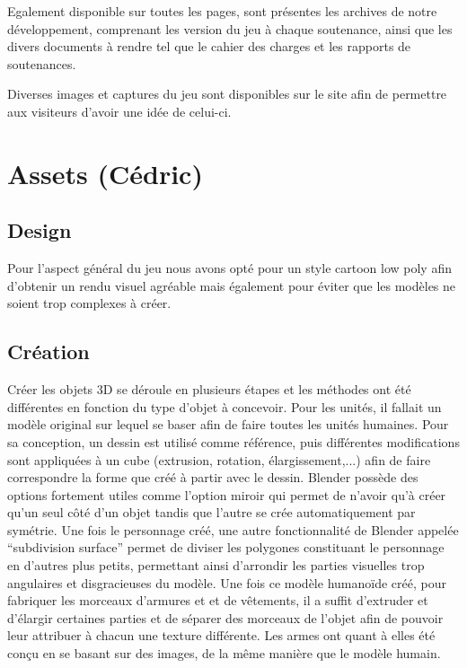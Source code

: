 \documentclass[12pt]{report}
\begin{document}
Egalement disponible sur toutes les pages, sont présentes les archives de notre
développement, comprenant les version du jeu à chaque soutenance, ainsi que les
divers documents à rendre tel que le cahier des charges et les rapports de
soutenances.

Diverses images et captures du jeu sont disponibles sur le site afin de
permettre aux visiteurs d’avoir une idée de celui-ci.

\section{Assets (Cédric)}

\subsection{Design}

Pour l’aspect général du jeu nous avons opté pour un style cartoon low poly afin
d’obtenir un rendu visuel agréable mais également pour éviter que les modèles ne
soient trop complexes à créer.

\subsection{Création}

Créer les objets 3D se déroule en plusieurs étapes et les méthodes ont été
différentes en fonction du type d’objet à concevoir. Pour les unités, il fallait
un modèle original sur lequel se baser afin de faire toutes les unités humaines.
Pour sa conception, un dessin est utilisé comme référence, puis différentes
modifications sont appliquées à un cube (extrusion, rotation, élargissement,...)
afin de faire correspondre la forme que créé à partir avec le dessin. Blender
possède des options fortement utiles comme l’option miroir qui permet de n’avoir
qu’à créer qu’un seul côté d’un objet tandis que l’autre se crée automatiquement
par symétrie. Une fois le personnage créé, une autre fonctionnalité de Blender
appelée “subdivision surface” permet de diviser les polygones constituant le
personnage en d’autres plus petits, permettant ainsi d’arrondir les parties
visuelles trop angulaires et disgracieuses du modèle. Une fois ce modèle
humanoïde créé, pour fabriquer les morceaux d’armures et et de vêtements, il a
suffit d’extruder et d’élargir certaines parties et de séparer des morceaux de
l’objet afin de pouvoir leur attribuer à chacun une texture différente. Les
armes ont quant à elles été conçu en se basant sur des images, de la même
manière que le modèle humain.
\end{document}
